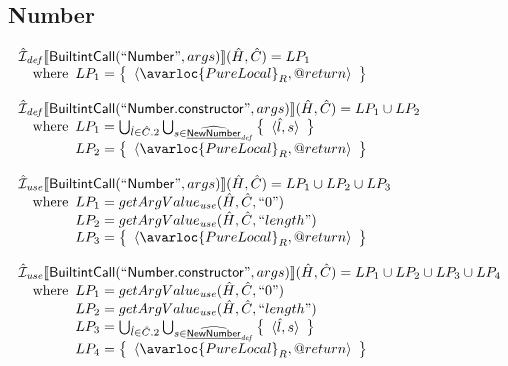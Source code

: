 \subsection{Number}
\[
\begin{array}{l}
\aI_{\it def}\lbr \SF{BuiltintCall}(``\SF{Number}",args)\rbr(\hat{H},\hat{C}) = LP_1\\
\quad\wherec{
  LP_1 = \set{\langle\avarloc{PureLocal}_R,\varprop{return}\rangle}\\
  }\\
\\

\aI_{\it def}\lbr \SF{BuiltintCall}(``\SF{Number.constructor}",args)\rbr(\hat{H},\hat{C}) = LP_1 \cup LP_2\\
\quad\wherec{
  LP_1 = \bigcup_{\hat{l} \in \hat{C}.2} \bigcup_{s \in \ahf{NewNumber}_{\it def}}
    \set{\langle \hat{l}, s \rangle}\\
  LP_2 = \set{\langle\avarloc{PureLocal}_R,\varprop{return}\rangle}\\
  }\\
\\


\aI_{\it use}\lbr \SF{BuiltintCall}(``\SF{Number}",args)\rbr(\hat{H},\hat{C}) = LP_1 \cup LP_2 \cup LP_3\\
\quad\wherec{
  LP_1 = getArgValue_{\it use}(\hat{H}, \hat{C}, ``0")\\
  LP_2 = getArgValue_{\it use}(\hat{H}, \hat{C}, ``length")\\
  LP_3 = \set{\langle\avarloc{PureLocal}_R,\varprop{return}\rangle}\\
  }\\
\\


\aI_{\it use}\lbr \SF{BuiltintCall}(``\SF{Number.constructor}",args)\rbr(\hat{H},\hat{C}) = LP_1 \cup LP_2 \cup LP_3 \cup LP_4\\
\quad\wherec{
  LP_1 = getArgValue_{\it use}(\hat{H}, \hat{C}, ``0")\\
  LP_2 = getArgValue_{\it use}(\hat{H}, \hat{C}, ``length")\\
  LP_3 = \bigcup_{\hat{l} \in \hat{C}.2} \bigcup_{s \in \ahf{NewNumber}_{\it def}}
    \set{\langle \hat{l}, s \rangle}\\
  LP_4 = \set{\langle\avarloc{PureLocal}_R,\varprop{return}\rangle}\\
  }\\
\\
\end{array}
\]

